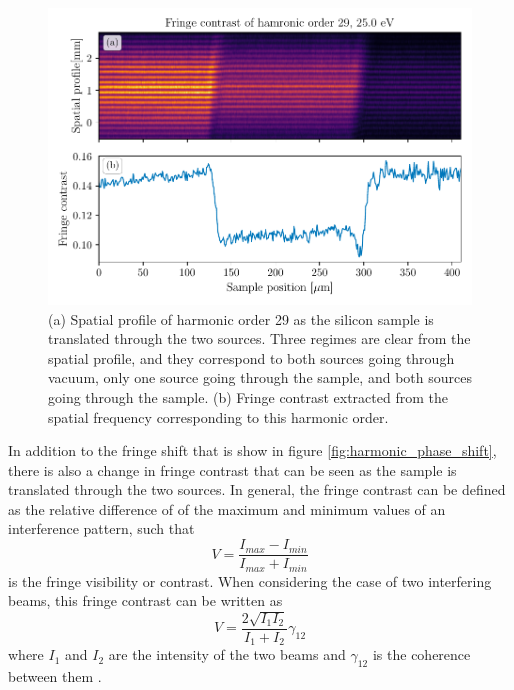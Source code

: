 \begin{figure}
	\centering
	\includegraphics[width=1.0\textwidth]{figures/refractive_index/spatialgram_fringe_contrast.pdf}
	\caption[Spatial profile and fringe contrast of a harmonic as sample is translated across the two XUV sources]{(a) Spatial profile of harmonic order 29 as the silicon sample is translated through the two sources. Three regimes are clear from the spatial profile, and they correspond to both sources going through vacuum, only one source going through the sample, and both sources going through the sample. (b) Fringe contrast extracted from the spatial frequency corresponding to this harmonic order.}
	\label{fig:harmonic_fringe_contrast}
\end{figure}
In addition to the fringe shift that is show in figure \ref{fig:harmonic_phase_shift}, there is also a change in fringe contrast that can be seen as the sample is translated through the two sources.  In general, the fringe contrast can be defined as the relative difference of of the maximum and minimum values of an interference pattern, such that
\begin{equation}
	V=\frac{I_{max} - I_{min}}{I_{max} + I_{min}}
\end{equation}
is the fringe visibility or contrast.  When considering the case of two interfering beams, this fringe contrast can be written as
\begin{equation}
\label{eqn:fringe_visibility} 
	V = \frac{2\sqrt{I_1 I_2}}{I_1 + I_2}\gamma_{12}
\end{equation}
where $I_1$ and $I_2$ are the intensity of the two beams and $\gamma_{12}$ is the coherence between them \cite{hemmersMulticolorXUVInterferometry2009, ditmireSpatialCoherenceMeasurement1996, wilsonDoubleSlitInterferometry2012}. 
